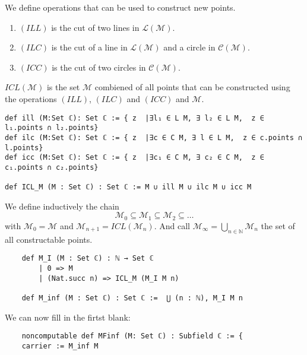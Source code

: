 \begin{definition}
    \label{def:rules_to_constructed_a_point}
    We define operations that can be used to construct new points.
    \begin{enumerate}
        \item $(ILL)$ is the cut of two lines in $\mathcal{L(M)}$.
        \item $(ILC)$ is the cut of a line in $\mathcal{L(M)}$ and a circle in $\mathcal{C(M)}$.
        \item $(ICC)$ is the cut of two circles in $\mathcal{C(M)}$.
    \end{enumerate}
    $ICL(\mathcal{M})$ is the set $\mathcal{M}$ combiened of all points that can be constructed using the operations $(ILL)$, $(ILC)$ and $(ICC)$ and $\mathcal{M}$.
\end{definition}

\begin{lstlisting}
def ill (M:Set ℂ): Set ℂ := { z  |∃l₁ ∈ L M, ∃ l₂ ∈ L M,  z ∈ l₁.points ∩ l₂.points}
def ilc (M:Set ℂ): Set ℂ := { z  |∃c ∈ C M, ∃ l ∈ L M,  z ∈ c.points ∩ l.points}
def icc (M:Set ℂ): Set ℂ := { z  |∃c₁ ∈ C M, ∃ c₂ ∈ C M,  z ∈ c₁.points ∩ c₂.points}

def ICL_M (M : Set ℂ) : Set ℂ := M ∪ ill M ∪ ilc M ∪ icc M
\end{lstlisting}

\begin{definition}
    \label{def:set_of_constructable_points}
    We define inductively the chain
    \begin{equation*}
        \mathcal{M}_0 \subseteq \mathcal{M}_1 \subseteq \mathcal{M}_2 \subseteq \dots
    \end{equation*}
    with $\mathcal{M}_0 = \mathcal{M}$ and $\mathcal{M}_{n+1} = ICL(\mathcal{M}_n)$.\newline
    And call $\mathcal{M}_{\infty} = \bigcup_{n \in \mathbb{N}} \mathcal{M}_n$ the set of all constructable points.
\end{definition}

\begin{lstlisting}
    def M_I (M : Set ℂ) : ℕ → Set ℂ
        | 0 => M
        | (Nat.succ n) => ICL_M (M_I M n)

    def M_inf (M : Set ℂ) : Set ℂ :=  ⋃ (n : ℕ), M_I M n
\end{lstlisting}

We can now fill in the firtst blank:
\begin{lstlisting}
    noncomputable def MFinf (M: Set ℂ) : Subfield ℂ := {
    carrier := M_inf M
\end{lstlisting}
